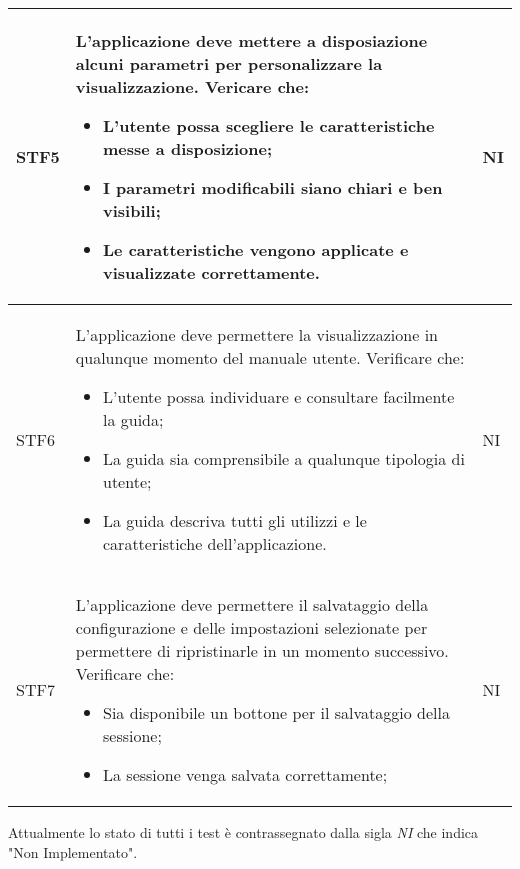 \begin{longtable}{|p{1.5cm}|p{11cm}|p{1cm}|}
        STF5 & L'applicazione deve mettere a disposiazione alcuni parametri per personalizzare la visualizzazione. Vericare che: \begin{itemize}
            \item L'utente possa scegliere le caratteristiche messe a disposizione;
            \item I parametri modificabili siano chiari e ben visibili;
            \item Le caratteristiche vengono applicate e visualizzate correttamente.
        \end{itemize} & NI\\ \hline

        STF6 & L'applicazione deve permettere la visualizzazione in qualunque momento del manuale utente. Verificare che: \begin{itemize}
            \item L'utente possa individuare e consultare facilmente la guida;
            \item La guida sia comprensibile a qualunque tipologia di utente;
            \item La guida descriva tutti gli utilizzi e le caratteristiche dell'applicazione.
        \end{itemize}& NI\\ \hline

        STF7 & L'applicazione deve permettere il salvataggio della configurazione e delle impostazioni selezionate per permettere di ripristinarle in un momento successivo. Verificare che: \begin{itemize}
            \item Sia disponibile un bottone per il salvataggio della sessione;
            \item La sessione venga salvata correttamente;
        \end{itemize}& NI\\ \hline
    \end{longtable}

    Attualmente lo stato di tutti i test è contrassegnato dalla sigla \textit{NI} che indica "Non Implementato".

